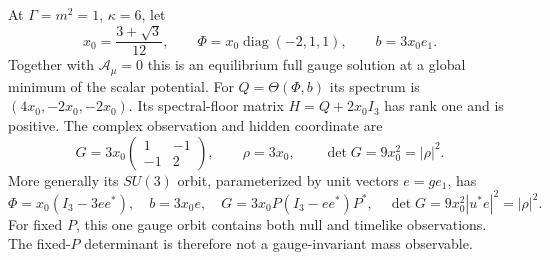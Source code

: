 \begin{proposition}
\label{q444:vacuum-observation}
At $\Gamma=m^2=1$, $\kappa=6$, let
\[
 x_0=\frac{3+\sqrt3}{12},\qquad
 \Phi=x_0\operatorname{diag}(-2,1,1),\qquad b=3x_0e_1.
\]
Together with $\mathcal A_\mu=0$ this is an equilibrium full gauge
solution at a global minimum of the scalar potential.
For $Q=\Theta(\Phi,b)$ its spectrum is $(4x_0,-2x_0,-2x_0)$.
Its spectral-floor matrix $H=Q+2x_0I_3$ has rank one and is positive.
The complex observation and hidden coordinate are
\[
 G=3x_0\begin{pmatrix}1&-1\\-1&2\end{pmatrix},
 \qquad \rho=3x_0,\qquad \det G=9x_0^2=|\rho|^2.
\]
More generally its $SU(3)$ orbit, parameterized by unit vectors
$e=ge_1$, has
\[
 \Phi=x_0(I_3-3ee^*),\quad b=3x_0e,\quad
 G=3x_0P(I_3-ee^*)P^*,\quad
 \det G=9x_0^2|u^*e|^2=|\rho|^2.
\]
For fixed $P$, this one gauge orbit contains both null and timelike
observations. The fixed-$P$ determinant is therefore not a
gauge-invariant mass observable.
\end{proposition}
